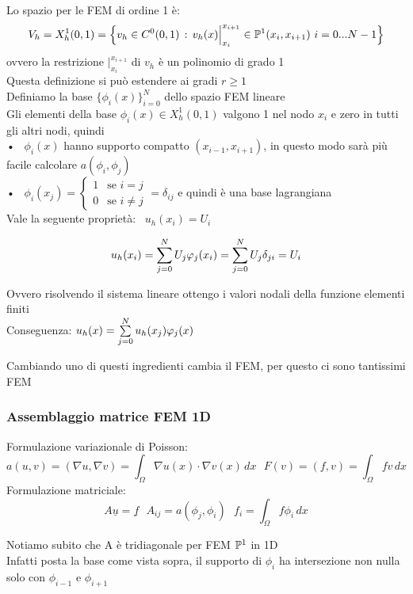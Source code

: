 \documentclass{article}
\newcommand{\om}{\Omega}
\renewcommand{\vv}[1]{\underline{#1}}
\begin{document}
Lo spazio per le FEM di ordine 1 è:
\[
V_h = X_h^1(0,1) = \Big\{v_h\in C^0(0,1) \, : \, v_h(x)\Big|_{x_i}^{x_{i+1}} \in \mathbb P^1 (x_i,x_{i+1}) \ i=0...N-1 \Big\}
\]
ovvero la restrizione $\Big|_{x_i}^{x_{i+1}}$ di $v_h$ è un polinomio di grado 1\\

Questa definizione si può estendere ai gradi $r\ge1$\\

Definiamo la base $\{\phi_i(x)\}_{i=0}^{N}$ dello spazio FEM lineare\\
Gli elementi della base $\phi_i(x)\in X_h^1(0,1)$ valgono 1 nel nodo $x_i$ e zero in tutti gli altri nodi, quindi\\
• \ $\phi_i(x)$ hanno supporto compatto $(x_{i-1},x_{i+1})$, in questo modo sarà più facile calcolare $a(\phi_i,\phi_j)$\\
• \ $\phi_i(x_j)=\begin{cases}
    1 \ \ \text{ se }i=j\\
    0 \  \ \text{ se }i\ne j
\end{cases} = \delta_{ij}$ e quindi è una base lagrangiana\\


Vale la seguente proprietà: \ $u_h(x_i)=U_i$
\begin{Dim}
\[
u_h(x_i)=\sum\limits_{j=0}^{N} U_j \varphi_j (x_i) = \sum\limits_{j=0}^{N} U_j\delta_{ji} = U_i \]
\end{Dim}
Ovvero risolvendo il sistema lineare ottengo i valori nodali della funzione elementi finiti\\

Conseguenza: $u_h(x)=\sum\limits_{j=0}^{N} u_h(x_j)\varphi_j(x)$



Cambiando uno di questi ingredienti cambia il FEM, per questo ci sono tantissimi FEM\\


\subsubsection*{Assemblaggio matrice FEM 1D}


Formulazione variazionale di Poisson:
\[
a(u,v)=(\nabla u, \nabla v) = \int_{\om}\nabla u(x)\cdot \nabla v(x) \, dx  \ \ \ F(v)=(f,v)=\int_{\om} fv\, dx
\]
Formulazione matriciale:
\[
A\vv{u} = \vv{f} \ \ \  A_{ij}=a(\phi_j,\phi_i) \ \ \ f_i=\int_{\om} f\phi_i\, dx
\]
\phantom{}

Notiamo subito che A è tridiagonale per FEM $\mathbb P^1$ in 1D\\
Infatti posta la base come vista sopra, il supporto di $\phi_i$ ha intersezione non nulla solo con $\phi_{i-1}$ e $\phi_{i+1}$\\
\end{document}
